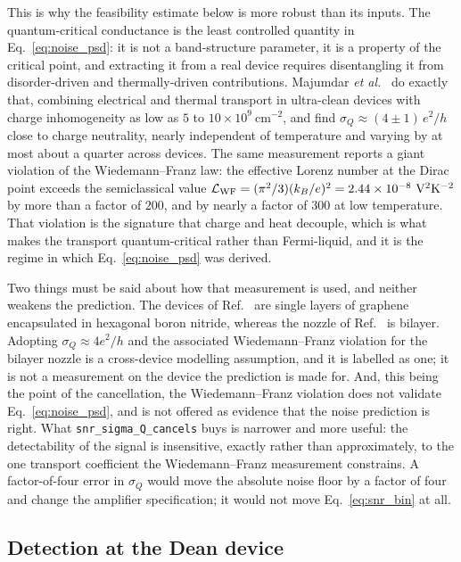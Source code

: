 \documentclass[aps,prd,reprint,nofootinbib,superscriptaddress]{revtex4-2}
\begin{document}
This is why the feasibility estimate below is more robust than its
inputs. The quantum-critical conductance is the least controlled quantity
in Eq.~\eqref{eq:noise_psd}: it is not a band-structure parameter, it is
a property of the critical point, and extracting it from a real device
requires disentangling it from disorder-driven and thermally-driven
contributions. Majumdar \emph{et al.}~\cite{Majumdar2025} do exactly
that, combining electrical and thermal transport in ultra-clean devices
with charge inhomogeneity as low as
$5$ to $10\times 10^9~\mathrm{cm}^{-2}$, and find
$\sigma_Q \approx (4\pm1)\,e^2/h$ close to charge neutrality, nearly
independent of temperature and varying by at most about a quarter across
devices. The same measurement reports a giant violation of the
Wiedemann--Franz law: the effective Lorenz number at the Dirac point
exceeds the semiclassical value
$\mathcal{L}_{\rm WF} = (\pi^2/3)(k_B/e)^2
= 2.44\times10^{-8}~\mathrm{V^2K^{-2}}$ by more than a factor of $200$,
and by nearly a factor of $300$ at low temperature. That violation is the
signature that charge and heat decouple, which is what makes the
transport quantum-critical rather than Fermi-liquid, and it is the regime
in which Eq.~\eqref{eq:noise_psd} was derived.

Two things must be said about how that measurement is used, and neither
weakens the prediction. The devices of Ref.~\cite{Majumdar2025} are
single layers of graphene encapsulated in hexagonal boron nitride,
whereas the nozzle of Ref.~\cite{Geurs2025} is bilayer. Adopting
$\sigma_Q \approx 4e^2/h$ and the associated Wiedemann--Franz violation
for the bilayer nozzle is a cross-device modelling assumption, and it is
labelled as one; it is not a measurement on the device the prediction is
made for. And, this being the point of the cancellation, the
Wiedemann--Franz violation does not validate Eq.~\eqref{eq:noise_psd},
and is not offered as evidence that the noise prediction is right. What
\texttt{snr\_sigma\_Q\_cancels} buys is narrower and more useful: the
detectability of the signal is insensitive, exactly rather than
approximately, to the one transport coefficient the Wiedemann--Franz
measurement constrains. A factor-of-four error in $\sigma_Q$ would move
the absolute noise floor by a factor of four and change the amplifier
specification; it would not move Eq.~\eqref{eq:snr_bin} at all.

\subsection{Detection at the Dean device}
\label{sec:gr-detect}
\end{document}
